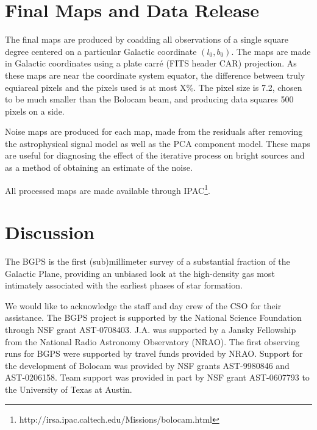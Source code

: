 \documentclass[12pt,preprint]{aastex}
\begin{document}
\clearpage 

\section{Final Maps and Data Release}
\label{sec:FinalMaps}

The final maps are produced by coadding all observations of a single
square degree centered on a particular Galactic coordinate
$(l_0,b_0)$.  The maps are made in Galactic coordinates using a plate
carr\'{e} (FITS header CAR) projection.  As these maps are near the
coordinate system equator, the difference between truly equiareal
pixels and the pixels used is at most X\%.  The pixel size is
7.2\arcsec, chosen to be much smaller than the Bolocam beam, and
producing data squares 500 pixels on a side.

Noise maps are produced for each map, made from the residuals after
removing the astrophysical signal model as well as the PCA component
model.  These maps are useful for diagnosing the effect of the
iterative process on bright sources and as a method of obtaining an
estimate of the noise.


All processed maps are made available through
IPAC\footnote{http://irsa.ipac.caltech.edu/Missions/bolocam.html}.


\section{Discussion}
\label{sec:Discussion}

The BGPS is the first (sub)millimeter survey of a substantial fraction
of the Galactic Plane, providing an unbiased look at the high-density
gas most intimately associated with the earliest phases of star
formation.

\acknowledgments

We would like to acknowledge the staff and day crew of the CSO for their
assistance. The BGPS project is supported by the National Science Foundation
through NSF grant AST-0708403. J.A. was supported by a Jansky Fellowship from
the National Radio Astronomy Observatory (NRAO). The first observing runs for
BGPS were supported by travel funds provided by NRAO. Support for the
development of Bolocam was provided by NSF grants AST-9980846 and AST-0206158.
Team support was provided in part by NSF grant AST-0607793 to the
University of Texas at Austin.
\end{document}
